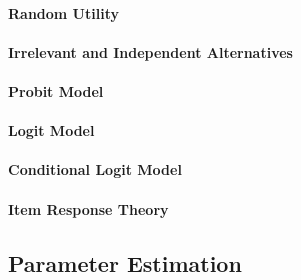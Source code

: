 \paragraph{Random Utility}

\paragraph{Irrelevant and Independent Alternatives}

\paragraph{Probit Model}

\paragraph{Logit Model}

\paragraph{Conditional Logit Model}

\paragraph{Item Response Theory}

\subsection{Parameter Estimation}
